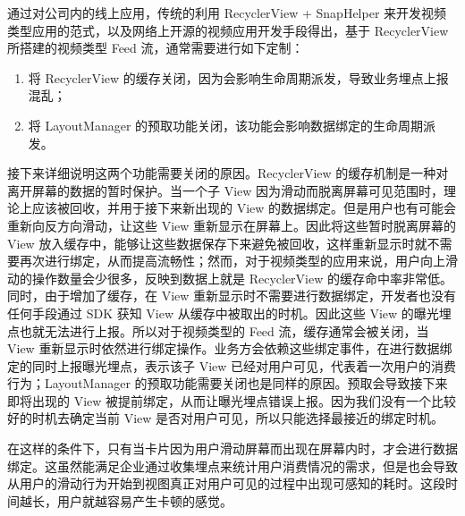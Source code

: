 
通过对公司内的线上应用，传统的利用 RecyclerView + SnapHelper 来开发视频类型应用的范式，以及网络上开源的视频应用开发手段得出，基于 RecyclerView 所搭建的视频类型 Feed 流，通常需要进行如下定制：

\begin{enumerate}
    \item 将 RecyclerView 的缓存关闭，因为会影响生命周期派发，导致业务埋点上报混乱；
    \item 将 LayoutManager 的预取功能关闭，该功能会影响数据绑定的生命周期派发。
\end{enumerate}

接下来详细说明这两个功能需要关闭的原因。RecyclerView 的缓存机制是一种对离开屏幕的数据的暂时保护。当一个子 View 因为滑动而脱离屏幕可见范围时，理论上应该被回收，并用于接下来新出现的 View 的数据绑定。但是用户也有可能会重新向反方向滑动，让这些 View 重新显示在屏幕上。因此将这些暂时脱离屏幕的 View 放入缓存中，能够让这些数据保存下来避免被回收，这样重新显示时就不需要再次进行绑定，从而提高流畅性；然而，对于视频类型的应用来说，用户向上滑动的操作数量会少很多，反映到数据上就是 RecyclerView 的缓存命中率非常低。同时，由于增加了缓存，在 View 重新显示时不需要进行数据绑定，开发者也没有任何手段通过 SDK 获知 View 从缓存中被取出的时机。因此这些 View 的曝光埋点也就无法进行上报。所以对于视频类型的 Feed 流，缓存通常会被关闭，当 View 重新显示时依然进行绑定操作。业务方会依赖这些绑定事件，在进行数据绑定的同时上报曝光埋点，表示该子 View 已经对用户可见，代表着一次用户的消费行为；LayoutManager 的预取功能需要关闭也是同样的原因。预取会导致接下来即将出现的 View 被提前绑定，从而让曝光埋点错误上报。因为我们没有一个比较好的时机去确定当前 View 是否对用户可见，所以只能选择最接近的绑定时机。

在这样的条件下，只有当卡片因为用户滑动屏幕而出现在屏幕内时，才会进行数据绑定。这虽然能满足企业通过收集埋点来统计用户消费情况的需求，但是也会导致从用户的滑动行为开始到视图真正对用户可见的过程中出现可感知的耗时。这段时间越长，用户就越容易产生卡顿的感觉。